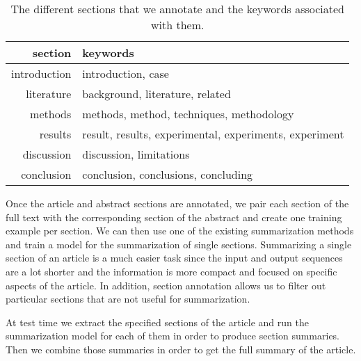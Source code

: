 \documentclass[runningheads]{llncs}
\begin{document}
\begin{table}[t!]
\begin{center}
\setlength\tabcolsep{0.2cm}
\begin{tabular}{|r|l|}
\hline \textbf{section} & \textbf{keywords}\\\hline
introduction & introduction, case\\
literature & background, literature, related\\
methods & methods, method, techniques, methodology\\
results & result, results, experimental, experiments, experiment\\
discussion & discussion, limitations\\
conclusion & conclusion, conclusions, concluding\\
\hline
\end{tabular}
\end{center}
\caption{\label{section_tags} The different sections that we annotate and the keywords associated with them.}
\end{table}

Once the article and abstract sections are annotated, we pair each section of the full text with the corresponding section of the abstract and create one training example per section. We can then use one of the existing summarization methods and train a model for the summarization of single sections. Summarizing a single section of an article is a much easier task since the input and output sequences are a lot shorter and the information is more compact and focused on specific aspects of the article. In addition, section annotation allows us to filter out particular sections that are not useful for summarization.

At test time we extract the specified sections of the article and run the summarization model for each of them in order to produce section summaries. Then we combine those summaries in order to get the full summary of the article.
\end{document}
